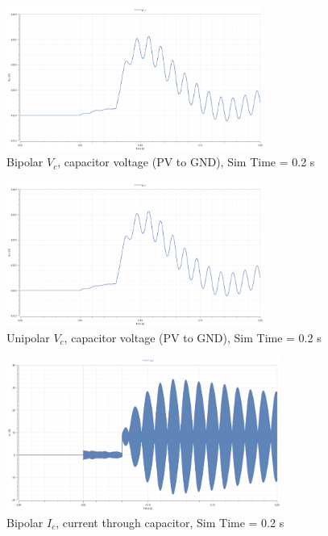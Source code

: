 \documentclass[12pt,twoside]{scrartcl}
\begin{document}
\begin{figure}[htp]
    \centering
    \includegraphics[width=0.75\textwidth]{Bipolar_Vc_0.2.png}
    \caption{Bipolar $V_c$, capacitor voltage (PV to GND), Sim Time = 0.2 s}
    \label{fig:BipolarVc0.2}
\end{figure}
\begin{figure}[htp]
    \centering
    \includegraphics[width=0.75\textwidth]{Unipolar_Vc_0.2.png}
    \caption{Unipolar $V_c$, capacitor voltage (PV to GND), Sim Time = 0.2 s}
    \label{fig:UnipolarVc0.2}
\end{figure}
\begin{figure}[htp]
    \centering
    \includegraphics[width=0.8\textwidth]{Bipolar_Ic_0.2.png}
    \caption{Bipolar $I_c$, current through capacitor, Sim Time = 0.2 s}
    \label{fig:BipolarIc0.2}
\end{figure}
\end{document}
